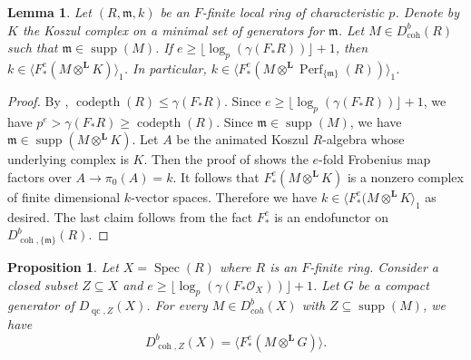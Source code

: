 \documentclass[11pt]{amsart}
\theoremstyle{plain}
\newtheorem{lemma}[theorem]{Lemma}
\newtheorem{proposition}[theorem]{Proposition}
\theoremstyle{definition}
\numberwithin{equation}{section}
\numberwithin{theorem}{section}
\begin{document}
\begin{lemma}
    \label{lem:residue_field_frobenius_generation}
    Let $(R,\mathfrak{m},k)$ be an $F$-finite local ring of characteristic $p$. Denote by $K$ the Koszul complex on a minimal set of generators for $\mathfrak{m}$. Let $M\in D_{\operatorname{coh}}^b(R)$ such that $\mathfrak{m}\in\operatorname{supp}(M)$. 
    If $e \geq \lfloor \log_p (\gamma(F_\ast R))\rfloor+1$, then $k \in \langle F_\ast^e (M\otimes^\mathbf{L} K) \rangle_1$. In particular, $k \in \langle F^e_\ast (M\otimes^\mathbf{L}\operatorname{Perf}_{\{\mathfrak{m}\}} (R)) \rangle_1$. 
\end{lemma}

\begin{proof}
    By , $\operatorname{codepth}(R) \leq \gamma(F_\ast R)$. Since $e \geq \lfloor \log_p (\gamma(F_\ast R))\rfloor+1$, we have $p^e> \gamma(F_\ast R) \geq \operatorname{codepth}(R)$. Since $\mathfrak{m}\in\operatorname{supp}(M)$, we have $\mathfrak{m}\in\operatorname{supp}(M\otimes^{\mathbf{L}}K)$. 
    Let $A$ be the animated Koszul $R$-algebra whose underlying complex is $K$.
    Then the proof of \cite[Theorem 4.1.13]{Bhatt/Blickle/Schwede/Tucker:2026} shows the $e$-fold Frobenius map factors over $A\to \pi_0(A)=k$. It follows that $F_\ast^e(M\otimes^{\mathbf{L}}K)$ is a nonzero complex of finite dimensional $k$-vector spaces. Therefore we have $k \in \langle F_\ast^e(M\otimes^{\mathbf{L}}K \rangle_1$ as desired. 
    The last claim follows from the fact $F_\ast^e$ is an endofunctor on $D^b_{\operatorname{coh},\{\mathfrak{m}\}} (R)$.
\end{proof}

\begin{proposition}
    \label{prop:relative_Frobenius_generation_local_ring}
    Let $X=\operatorname{Spec}(R)$ where $R$ is an $F$-finite ring. 
    Consider a closed subset $Z\subseteq X$ and $e \geq \lfloor \log_p (\gamma(F_\ast \mathcal{O}_X))\rfloor + 1$.
    Let $G$ be a compact generator of $D_{\operatorname{qc},Z}(X)$. For every $M\in D_{coh}^b(X)$ with $Z\subseteq\operatorname{supp}(M)$, we have
    \begin{displaymath}
        D^b_{\operatorname{coh},Z}(X)= \langle F_\ast^e (M\otimes^{\mathbf{L}}G) \rangle.
    \end{displaymath}
\end{proposition}
\end{document}
